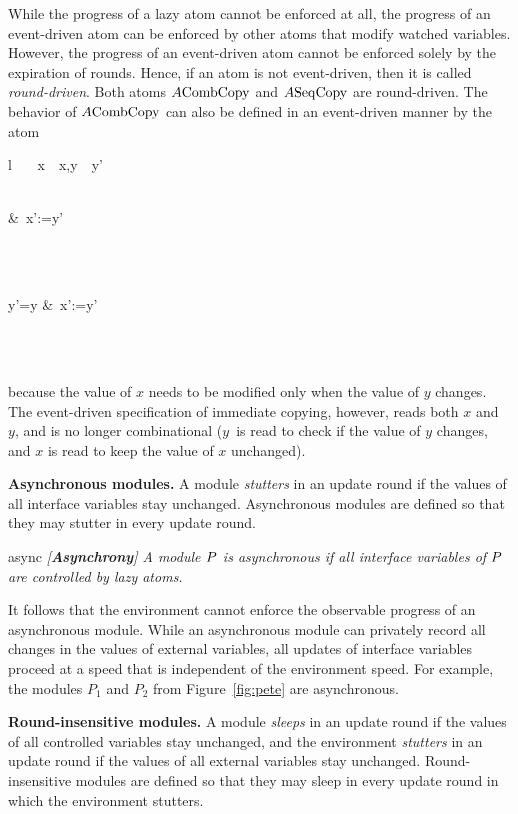 \mypar
While the progress of a lazy atom cannot be enforced at all, the progress of
an event-driven atom can be enforced by other atoms that modify watched
variables.
However, the progress of an event-driven atom cannot be enforced solely by
the expiration of rounds.
Hence, if an atom is not event-driven, then it is called {\em round-driven}.
Both atoms $A{\rm Comb\-Copy}$ and $A{\rm Seq\-Copy}$ are round-driven.
The behavior of $A{\rm Comb\-Copy}$ can also be defined in an event-driven manner by
the atom
\begin{mtab}{l}
  \qu \ATOM\   \ECopy\ \CONTROLS\ x\ \READS\ x,y\ \AWAITS\ y'\\
  \qqu \INIT\\
  \qqu \begin{chtab}
    \true &\ x':=y'
  \end{chtab}\\
  \qqu \UPDATE\\
  \qqu \begin{chtab}
    y'\not=y &\ x':=y'
  \end{chtab} \\
  \qu \ENDA \\
\end{mtab}
because the value of $x$ needs to be modified only when the value of $y$
changes.
The event-driven specification of immediate copying, however, reads both $x$
and~$y$, and is no longer combinational
($y$~is read to check if the value of $y$ changes, and $x$ is read to keep
the value of $x$ unchanged).

\mypar
{\bf Asynchronous modules.}
A module {\em stutters\/} in an update round if the values of all interface
variables stay unchanged.
Asynchronous modules are defined so that they may stutter in every update
round.

\begin{definition}{async}\it
  {\em [{\bf Asynchrony}]}
  A module ${P}$ is {\em asynchronous\/} if all interface variables of ${P}$
  are controlled by lazy atoms.
\end{definition}

\mypar
It follows that the environment cannot enforce the observable progress of an
asynchronous module.
While an asynchronous module can privately record all changes in the values
of external variables, all updates of interface variables proceed at a speed
that is independent of the environment speed.
For example, the modules $P_1$ and $P_2$ from Figure~\ref{fig:pete} are
asynchronous.

\mypar
{\bf Round-insensitive modules.}
A module {\em sleeps\/} in an update round if the values of all controlled
variables stay unchanged, and the environment {\em stutters\/} in an update
round if the values of all external variables stay unchanged.
Round-insensitive modules are defined so that they may sleep in every update
round in which the environment stutters.

